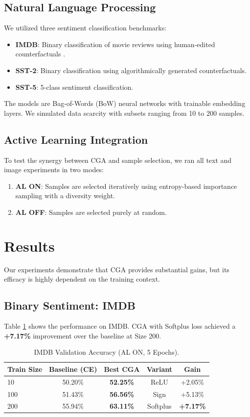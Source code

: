 \documentclass[sigconf,anonymous]{aamas}
\begin{document}
\subsection{Natural Language Processing}
We utilized three sentiment classification benchmarks:
\begin{itemize}
    \item \textbf{IMDB}: Binary classification of movie reviews using human-edited counterfactuals \cite{Kaushik2020Learning}.
    \item \textbf{SST-2}: Binary classification using algorithmically generated counterfactuals.
    \item \textbf{SST-5}: 5-class sentiment classification.
\end{itemize}
The models are Bag-of-Words (BoW) neural networks with trainable embedding layers. We simulated data scarcity with subsets ranging from 10 to 200 samples.

\subsection{Active Learning Integration}
To test the synergy between CGA and sample selection, we ran all text and image experiments in two modes:
\begin{enumerate}
    \item \textbf{AL ON}: Samples are selected iteratively using entropy-based importance sampling with a diversity weight.
    \item \textbf{AL OFF}: Samples are selected purely at random.
\end{enumerate}

\section{Results}
Our experiments demonstrate that CGA provides substantial gains, but its efficacy is highly dependent on the training context.

\subsection{Binary Sentiment: IMDB}
Table \ref{tab:imdb_results} shows the performance on IMDB. CGA with Softplus loss achieved a \textbf{+7.17\%} improvement over the baseline at Size 200.

\begin{table}[h]
\centering
\caption{IMDB Validation Accuracy (AL ON, 5 Epochs).}
\label{tab:imdb_results}
\begin{tabular}{@{}lcccc@{}}
\toprule
\textbf{Train Size} & \textbf{Baseline (CE)} & \textbf{Best CGA} & \textbf{Variant} & \textbf{Gain} \\ \midrule
10 & 50.20\% & \textbf{52.25\%} & ReLU & +2.05\% \\
100 & 51.43\% & \textbf{56.56\%} & Sign & +5.13\% \\
200 & 55.94\% & \textbf{63.11\%} & Softplus & \textbf{+7.17\%} \\ \bottomrule
\end{tabular}
\end{table}
\end{document}
